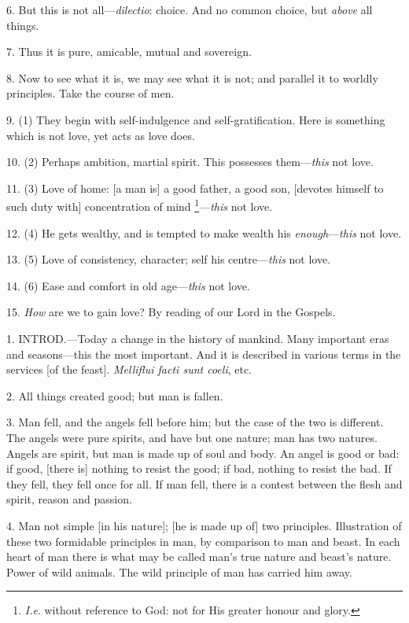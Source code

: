 6. But this is not all—\emph{dilectio}: choice.
And no common choice, but \emph{above} all things.

7. Thus it is pure, amicable, mutual and
sovereign.

8. Now to see what it is, we may see what it is
not; and parallel it to worldly principles. Take the course of
men.

9. (1) They begin with self-indulgence and
self-gratification. Here is something which is not love, yet acts as
love does.

10. (2) Perhaps ambition, martial spirit. This
possesses them—\emph{this} not love.

11. (3) Love of home: [a man is] a good father, a
good son, [devotes himself to such duty with] concentration of mind \footnote{\emph{I.e}. without
reference to God: not for His greater honour and glory.}—\emph{this} not love.

12. (4) He gets wealthy, and is tempted to make
wealth his \emph{enough}—\emph{this} not love.

13. (5) Love of consistency, character; self his
centre—\emph{this} not love.

14. (6) Ease and comfort in old age—\emph{this}
not love.

15. \emph{How} are we to gain love? By reading of
our Lord in the Gospels.


1. INTROD.—Today
a change in the history of mankind. Many important eras and
seasons—this the most important. And it is described in various
terms in the services [of the feast]. \emph{Melliflui facti sunt coeli},
etc.

2. All things created good; but man is fallen.

3. Man fell, and the angels fell before him; but
the case of the two is different. The angels were pure spirits, and
have but one nature; man has two natures. Angels are spirit, but
man is made up of soul and body. An angel is good or bad: if good,
[there is] nothing to resist the good; if bad, nothing to resist the
bad. If they fell, they fell once for all. If man fell, there is a
contest between the flesh and spirit, reason and passion.

4. Man not simple [in his nature]; [he is made up
of] two principles. Illustration of these two formidable principles in
man, by comparison to man and beast. In each heart of man there is
what may be called man's true nature and beast's nature. Power of wild
animals. The wild principle of man has carried him away.

